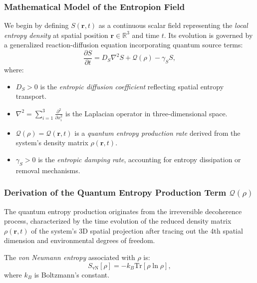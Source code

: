 \documentclass[12pt]{article}
\begin{document}
\subsubsection*{Mathematical Model of the Entropion Field}

We begin by defining \( S(\mathbf{r}, t) \) as a continuous scalar field representing the \emph{local entropy density} at spatial position \(\mathbf{r} \in \mathbb{R}^3\) and time \(t\). Its evolution is governed by a generalized reaction-diffusion equation incorporating quantum source terms:
\begin{equation}
\frac{\partial S}{\partial t} = D_S \nabla^2 S + \mathcal{Q}(\rho) - \gamma_S S,
\label{eq:entropic_field_pde}
\end{equation}
where:
\begin{itemize}
    \item \(D_S > 0\) is the \emph{entropic diffusion coefficient} reflecting spatial entropy transport.
    \item \(\nabla^2 = \sum_{i=1}^3 \frac{\partial^2}{\partial x_i^2}\) is the Laplacian operator in three-dimensional space.
    \item \(\mathcal{Q}(\rho) = \mathcal{Q}(\mathbf{r}, t)\) is a \emph{quantum entropy production rate} derived from the system's density matrix \(\rho(\mathbf{r}, t)\).
    \item \(\gamma_S > 0\) is the \emph{entropic damping rate}, accounting for entropy dissipation or removal mechanisms.
\end{itemize}

\subsubsection*{Derivation of the Quantum Entropy Production Term \(\mathcal{Q}(\rho)\)}

The quantum entropy production originates from the irreversible decoherence process, characterized by the time evolution of the reduced density matrix \(\rho(\mathbf{r}, t)\) of the system's 3D spatial projection after tracing out the 4th spatial dimension and environmental degrees of freedom.

The \emph{von Neumann entropy} associated with \(\rho\) is:
\begin{equation}
S_{\mathrm{vN}}[\rho] = -k_B \mathrm{Tr} \left[ \rho \ln \rho \right],
\label{eq:von_neumann_entropy_def}
\end{equation}
where \(k_B\) is Boltzmann’s constant.
\end{document}
